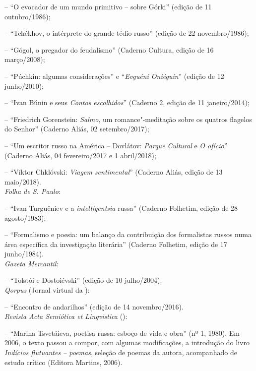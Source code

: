 {\noindent{}-- ``O evocador de um mundo primitivo -- sobre Górki'' (edição de 11 outubro/1986);

\noindent{}-- ``Tchékhov, o intérprete do grande tédio russo'' (edição de 22 novembro/1986); 

\noindent{}-- ``Gógol, o pregador do feudalismo'' (Caderno Cultura, edição de 16 março/2008); 

\noindent{}-- ``Púchkin: algumas considerações'' e ``\emph{Evguéni Oniéguin}'' (edição de 12 junho/2010); 

\noindent{}-- ``Ivan Búnin e seus \emph{Contos escolhidos}'' (Caderno 2, edição de 11 janeiro/2014); 

\noindent{}-- ``Friedrich Gorenstein: \emph{Salmo}, um romance"-meditação sobre os quatros flagelos do Senhor'' (Caderno Aliás, 02 setembro/2017); 

\noindent{}-- ``Um escritor russo na América -- Dovlátov: \emph{Parque Cultural} e \emph{O ofício}'' (Caderno Aliás, 04 fevereiro/2017 e 1 abril/2018); 

\noindent{}-- ``Víktor Chklóvski: \emph{Viagem sentimental}'' (Caderno Aliás, edição de 13 maio/2018). \\

\noindent{}\emph{Folha de S. Paulo}:

\noindent{}-- ``Ivan Turguêniev e a \emph{intelligentsia} russa'' (Caderno Folhetim, edição de 28 agosto/1983);

\noindent{}-- ``Formalismo e poesia: um balanço da contribuição dos formalistas russos numa
área específica da investigação literária'' (Caderno Folhetim, edição de 17 junho/1984). \\

\noindent{}\emph{Gazeta Mercantil}:

\noindent{}-- ``Tolstói e Dostoiévski'' (edição de 10 julho/2004). \\

\noindent{}\emph{Qorpus} (Jornal virtual da ):

\noindent{}-- ``Encontro de andarilhos'' (edição de 14 novembro/2016). \\

\noindent{}\emph{Revista Acta Semiótica et Lingvistica} ():

\noindent{}-- ``Marina Tsvetáieva, poetisa russa: esboço de vida e obra'' (nº 1, 1980). Em 2006, o texto passou a compor, com algumas modificações, a introdução do livro \emph{Indícios flutuantes -- poemas}, seleção de poemas da autora, acompanhado de estudo crítico (Editora Martins, 2006). \\

}
